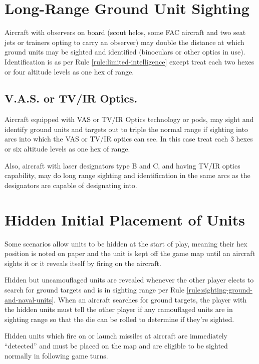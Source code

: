 \begin{advancedrules}
    \section{Long-Range Ground Unit Sighting}

    Aircraft with observers on board (scout helos, some FAC aircraft and two seat jets or trainers opting to carry an observer) may double the distance at which ground units may be sighted and identified (binoculars or other optics in use).  Identification is as per Rule \ref{rule:limited-intelligence} except treat each two hexes or four altitude levels as one hex of range.

    \subsection{V.A.S. or TV/IR Optics.} Aircraft equipped with VAS or TV/IR Optics technology or pods, may sight and identify ground units and targets out to triple the normal range if sighting into arcs into which the VAS or TV/IR optics can see. In this case treat each 3 hexes or six altitude levels as one hex of range.

    Also, aircraft with laser designators type B and C, and having TV/IR optics capability, may do long range sighting and identification in the same arcs as the designators are capable of designating into.

    \section{Hidden Initial Placement of Units}

    Some scenarios allow units to be hidden at the start of play, meaning their hex position is noted on paper and the unit is kept off the game map until an aircraft sights it or it reveals itself by firing on the aircraft.

    Hidden but uncamouflaged units are revealed whenever the other player elects to search for ground targets and is in sighting range per Rule \ref{rule:sighting-ground-and-naval-units}. When an aircraft searches for ground targets, the player with the hidden units must tell the other player if any camouflaged units are in sighting range so that the die can be rolled to determine if they're sighted.

    Hidden units which fire on or launch missiles at aircraft are immediately “detected” and must be placed on the map and are eligible to be sighted normally in following game turns.


\end{advancedrules}
